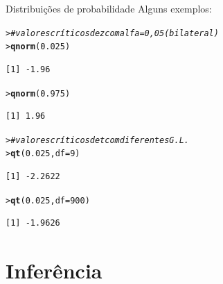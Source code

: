 \documentclass[10pt]{beamer}\usepackage[]{graphicx}\usepackage[]{color}
\makeatletter
\newcommand{\hlnum}[1]{\textcolor[rgb]{0.686,0.059,0.569}{#1}}%
\newcommand{\hlcom}[1]{\textcolor[rgb]{0.498,0.498,0.498}{\textit{#1}}}%
\newcommand{\hlstd}[1]{\textcolor[rgb]{0.345,0.345,0.345}{#1}}%
\newcommand{\hlkwc}[1]{\textcolor[rgb]{0.333,0.667,0.333}{#1}}%
\newcommand{\hlkwd}[1]{\textcolor[rgb]{0.282,0.239,0.545}{\textbf{#1}}}%
\newenvironment{kframe}{%
 \def\at@end@of@kframe{}%
 \ifinner\ifhmode%
  \def\at@end@of@kframe{\end{minipage}}%
  \begin{minipage}{\columnwidth}%
 \fi\fi%
 \def\FrameCommand##1{\hskip\@totalleftmargin \hskip-\fboxsep
 \colorbox{shadecolor}{##1}\hskip-\fboxsep
     \hskip-\linewidth \hskip-\@totalleftmargin \hskip\columnwidth}%
 \MakeFramed {\advance\hsize-\width
   \@totalleftmargin\z@ \linewidth\hsize
   \@setminipage}}%
 {\par\unskip\endMakeFramed%
 \at@end@of@kframe}
\newenvironment{knitrout}{}{} %
\makeatother
\begin{document}
\begin{frame}[fragile=singleslide]{Distribuições de probabilidade}
Alguns exemplos:
\begin{knitrout}\small
{}\color{fgcolor}\begin{kframe}
\begin{alltt}
\hlstd{> }\hlcom{# valores críticos de z com alfa = 0,05 (bilateral)}
\hlstd{> }\hlkwd{qnorm}\hlstd{(}\hlnum{0.025}\hlstd{)}
\end{alltt}
\begin{verbatim}
[1] -1.96
\end{verbatim}
\begin{alltt}
\hlstd{> }\hlkwd{qnorm}\hlstd{(}\hlnum{0.975}\hlstd{)}
\end{alltt}
\begin{verbatim}
[1] 1.96
\end{verbatim}
\begin{alltt}
\hlstd{> }\hlcom{# valores críticos de t com diferentes G.L.}
\hlstd{> }\hlkwd{qt}\hlstd{(}\hlnum{0.025}\hlstd{,} \hlkwc{df} \hlstd{=} \hlnum{9}\hlstd{)}
\end{alltt}
\begin{verbatim}
[1] -2.2622
\end{verbatim}
\begin{alltt}
\hlstd{> }\hlkwd{qt}\hlstd{(}\hlnum{0.025}\hlstd{,}\hlkwc{df} \hlstd{=} \hlnum{900}\hlstd{)}
\end{alltt}
\begin{verbatim}
[1] -1.9626
\end{verbatim}
\end{kframe}
\end{knitrout}

\end{frame}


\section{Inferência}
\end{document}
